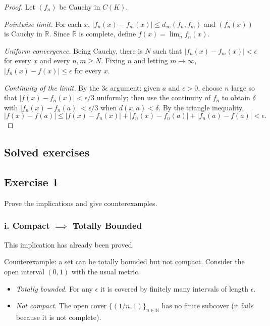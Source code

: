 \documentclass[11pt, a4paper]{article}
\begin{document}
\begin{proof}
Let $(f_n)$ be Cauchy in $C(K)$.

\textit{Pointwise limit.} For each $x$, $|f_n(x) - f_m(x)| \le d_\infty(f_n, f_m)$ and $(f_n(x))$ is
Cauchy in $\mathbb{R}$. Since $\mathbb{R}$ is complete, define $f(x) = \lim_n f_n(x)$.

\textit{Uniform convergence.} Being Cauchy, there is $N$ such that $|f_n(x) - f_m(x)| < \epsilon$
for every $x$ and every $n, m \ge N$. Fixing $n$ and letting $m \to \infty$,
$|f_n(x) - f(x)| \le \epsilon$ for every $x$.

\textit{Continuity of the limit.} By the $3\epsilon$ argument: given $a$ and $\epsilon > 0$,
choose $n$ large so that $|f(x) - f_n(x)| < \epsilon/3$ uniformly; then use the
continuity of $f_n$ to obtain $\delta$ with $|f_n(x) - f_n(a)| < \epsilon/3$ when
$d(x, a) < \delta$. By the triangle
inequality,
$$ |f(x) - f(a)| \le |f(x) - f_n(x)| + |f_n(x) - f_n(a)| + |f_n(a) - f(a)| < \epsilon. $$
\end{proof}

\newpage

\subsection{Solved exercises}

\subsection*{Exercise 1}

Prove the implications and give counterexamples.

\subsubsection*{i. Compact $\implies$ Totally Bounded}
This implication has already been proved.

Counterexample: a set can be totally bounded but not compact. Consider the open
interval $(0, 1)$ with the usual metric.
\begin{itemize}
    \item \textit{Totally bounded.} For any $\epsilon$ it is covered by finitely many intervals
    of length $\epsilon$.
    \item \textit{Not compact.} The open cover $\{(1/n, 1)\}_{n \in \mathbb{N}}$ has no
    finite subcover (it fails because it is not complete).
\end{itemize}
\end{document}
